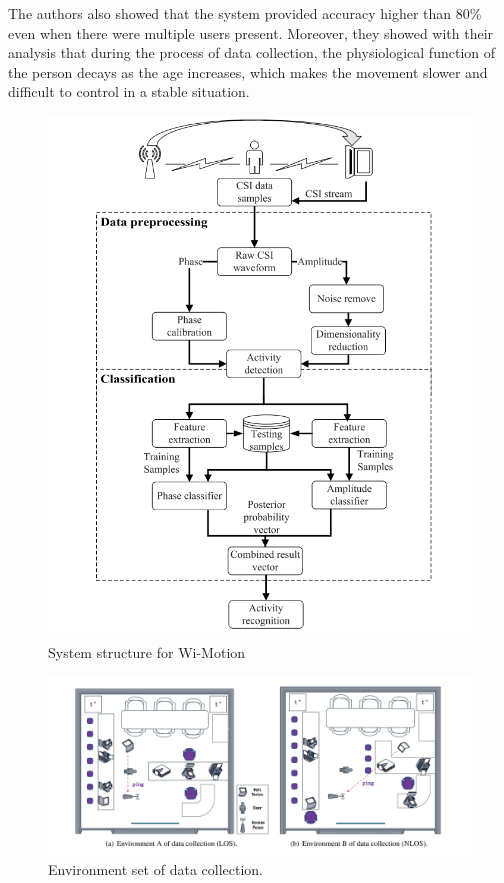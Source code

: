 The authors also showed that the system provided accuracy higher than 80\% even when there were multiple users present. Moreover, they showed with their analysis that  during the process of data collection,
the physiological function of the person decays as the age increases, which makes the movement slower and difficult to control in a stable situation.

\begin{figure}[H]
\centering
\includegraphics[width=1.0\textwidth]{./figure/chap 2/2.png}
\caption{System structure for Wi-Motion}
\label{2.2}
\end{figure}


\begin{figure}[H]
\centering
\includegraphics[width=1.0\textwidth]{./figure/chap 2/3.png}
\caption{Environment set of data collection.}
\label{2.3}
\end{figure}
 
